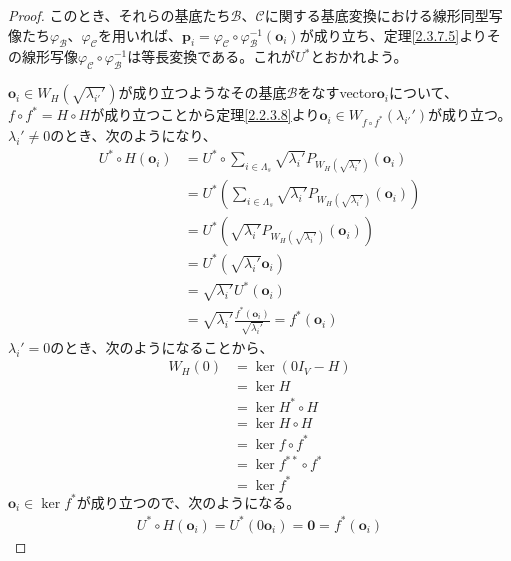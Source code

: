 \documentclass[dvipdfmx]{jsarticle}
\begin{document}
\begin{proof}
このとき、それらの基底たち$\mathcal{B}$、$\mathcal{C}$に関する基底変換における線形同型写像たち$\varphi_{\mathcal{B}}$、$\varphi_{\mathcal{C}}$を用いれば、$\mathbf{p}_{i} = \varphi_{\mathcal{C}} \circ \varphi_{\mathcal{B}}^{- 1}\left( \mathbf{o}_{i} \right)$が成り立ち、定理\ref{2.3.7.5}よりその線形写像$\varphi_{\mathcal{C}} \circ \varphi_{\mathcal{B}}^{- 1}$は等長変換である。これが$U^{*}$とおかれよう。\par
$\mathbf{o}_{i} \in W_{H}\left( \sqrt{\lambda_{i'}'} \right)$が成り立つようなその基底$\mathcal{B}$をなすvector$\mathbf{o}_{i}$について、$f \circ f^{*} = H \circ H$が成り立つことから定理\ref{2.2.3.8}より$\mathbf{o}_{i} \in W_{f \circ f^{*}}\left( \lambda_{i'}' \right)$が成り立つ。$\lambda_{i}' \neq 0$のとき、次のようになり、
\begin{align*}
U^{*} \circ H\left( \mathbf{o}_{i} \right) &= U^{*} \circ \sum_{i \in \varLambda_{s}} {\sqrt{\lambda_{i}'}P_{W_{H}\left( \sqrt{\lambda_{i}'} \right)}}\left( \mathbf{o}_{i} \right)\\
&= U^{*}\left( \sum_{i \in \varLambda_{s}} {\sqrt{\lambda_{i}'}P_{W_{H}\left( \sqrt{\lambda_{i}'} \right)}}\left( \mathbf{o}_{i} \right) \right)\\
&= U^{*}\left( \sqrt{\lambda_{i}'}P_{W_{H}\left( \sqrt{\lambda_{i}'} \right)}\left( \mathbf{o}_{i} \right) \right)\\
&= U^{*}\left( \sqrt{\lambda_{i}'}\mathbf{o}_{i} \right)\\
&= \sqrt{\lambda_{i}'}U^{*}\left( \mathbf{o}_{i} \right)\\
&= \sqrt{\lambda_{i}'}\frac{f^{*}\left( \mathbf{o}_{i} \right)}{\sqrt{\lambda_{i}'}} = f^{*}\left( \mathbf{o}_{i} \right)
\end{align*}
$\lambda_{i}' = 0$のとき、次のようになることから、
\begin{align*}
W_{H}(0) &= \ker\left( 0I_{V} - H \right)\\
&= \ker H\\
&= \ker{H^{*} \circ H}\\
&= \ker{H \circ H}\\
&= \ker{f \circ f^{*}}\\
&= \ker{f^{**} \circ f^{*}}\\
&= \ker f^{*}
\end{align*}
$\mathbf{o}_{i} \in \ker f^{*}$が成り立つので、次のようになる。
\begin{align*}
U^{*} \circ H\left( \mathbf{o}_{i} \right) = U^{*}\left( 0\mathbf{o}_{i} \right) = \mathbf{0} = f^{*}\left( \mathbf{o}_{i} \right)
\end{align*}\par

\end{proof}
\end{document}
